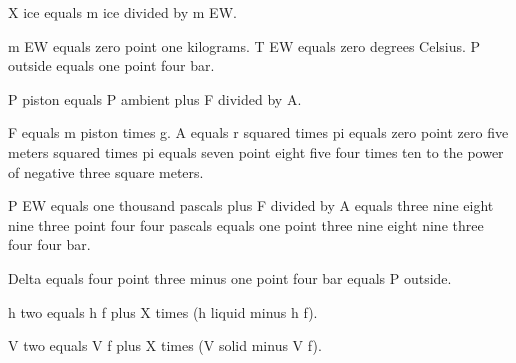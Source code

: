 X ice equals m ice divided by m EW.  

m EW equals zero point one kilograms.  
T EW equals zero degrees Celsius.  
P outside equals one point four bar.  

P piston equals P ambient plus F divided by A.  

F equals m piston times g.  
A equals r squared times pi equals zero point zero five meters squared times pi equals seven point eight five four times ten to the power of negative three square meters.  

P EW equals one thousand pascals plus F divided by A equals three nine eight nine three point four four pascals equals one point three nine eight nine three four four bar.  

Delta equals four point three minus one point four bar equals P outside.  

h two equals h f plus X times (h liquid minus h f).  

V two equals V f plus X times (V solid minus V f).